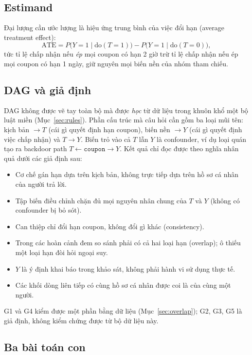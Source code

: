 \documentclass[pdflatex,sn-mathphys-num]{sn-jnl}%
\newcommand{\var}[1]{\texttt{#1}}                 %
\newcommand{\doop}{\mathrm{do}}                   %
\newcommand{\ATE}{\mathrm{ATE}}
\begin{document}
\subsection{Estimand}

Đại lượng cần ước lượng là hiệu ứng trung bình của việc đổi hạn (average treatment effect):
\begin{equation}\label{eq:ate}
\ATE = P\big(Y{=}1 \mid \doop(T{=}1)\big) - P\big(Y{=}1 \mid \doop(T{=}0)\big),
\end{equation}
tức tỉ lệ chấp nhận nếu \emph{ép} mọi coupon có hạn 2 giờ trừ tỉ lệ chấp nhận nếu ép mọi coupon có hạn 1 ngày, giữ nguyên mọi biến nền của nhóm tham chiếu.

\subsection{DAG và giả định}

DAG không được vẽ tay toàn bộ mà được \emph{học} từ dữ liệu trong khuôn khổ một bộ luật miền (Mục~\ref{sec:rules}). Phần cấu trúc mà câu hỏi cần gồm ba loại mũi tên: kịch bản $\to T$ (cái gì quyết định hạn coupon), biến nền $\to Y$ (cái gì quyết định việc chấp nhận) và $T \to Y$. Biến trỏ vào cả $T$ lẫn $Y$ là confounder, ví dụ loại quán tạo ra backdoor path $T \leftarrow \var{coupon} \to Y$. Kết quả chỉ đọc được theo nghĩa nhân quả dưới các giả định sau:

\begin{itemize}
\item[G1] Cơ chế gán hạn dựa trên kịch bản, không trực tiếp dựa trên hồ sơ cá nhân của người trả lời.
\item[G2] Tập biến điều chỉnh chặn đủ mọi nguyên nhân chung của $T$ và $Y$ (không có confounder bị bỏ sót).
\item[G3] Can thiệp chỉ đổi hạn coupon, không đổi gì khác (consistency).
\item[G4] Trong các hoàn cảnh đem so sánh phải có cả hai loại hạn (overlap); ô thiếu một loại hạn đòi hỏi ngoại suy.
\item[G5] $Y$ là ý định khai báo trong khảo sát, không phải hành vi sử dụng thực tế.
\item[G6] Các khối dòng liên tiếp có cùng hồ sơ cá nhân được coi là của cùng một người.
\end{itemize}

G1 và G4 kiểm được một phần bằng dữ liệu (Mục~\ref{sec:overlap}); G2, G3, G5 là giả định, không kiểm chứng được từ bộ dữ liệu này.

\subsection{Ba bài toán con}
\end{document}
